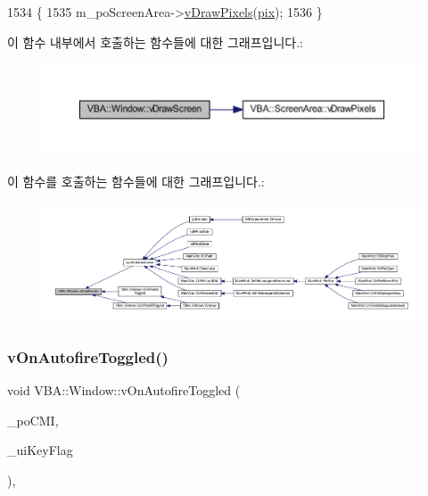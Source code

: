 \begin{DoxyCode}
1534 \{
1535   m\_poScreenArea->\mbox{\hyperlink{class_v_b_a_1_1_screen_area_ad7b6579afb665abf3b6a5004f03b63f8}{vDrawPixels}}(\mbox{\hyperlink{_g_b_8cpp_a5ee6554b606dcde59ac92578b33776d0}{pix}});
1536 \}
\end{DoxyCode}
이 함수 내부에서 호출하는 함수들에 대한 그래프입니다.\+:
\nopagebreak
\begin{figure}[H]
\begin{center}
\leavevmode
\includegraphics[width=350pt]{class_v_b_a_1_1_window_af82e47600303a15b2aa4fdffb90df394_cgraph}
\end{center}
\end{figure}
이 함수를 호출하는 함수들에 대한 그래프입니다.\+:
\nopagebreak
\begin{figure}[H]
\begin{center}
\leavevmode
\includegraphics[width=350pt]{class_v_b_a_1_1_window_af82e47600303a15b2aa4fdffb90df394_icgraph}
\end{center}
\end{figure}
\mbox{\label{class_v_b_a_1_1_window_a7267bdc270816ef841f3fe1bcfd03f27}} 
\subsubsection{\texorpdfstring{v\+On\+Autofire\+Toggled()}{vOnAutofireToggled()}}
{\footnotesize\ttfamily void V\+B\+A\+::\+Window\+::v\+On\+Autofire\+Toggled (\begin{DoxyParamCaption}\item[{Gtk\+::\+Check\+Menu\+Item $\ast$}]{\+\_\+po\+C\+MI,  }\item[{\mbox{\hyperlink{_system_8h_a10e94b422ef0c20dcdec20d31a1f5049}{u32}}}]{\+\_\+ui\+Key\+Flag }\end{DoxyParamCaption})\hspace{0.3cm}{\ttfamily [protected]}, {\ttfamily [virtual]}}



